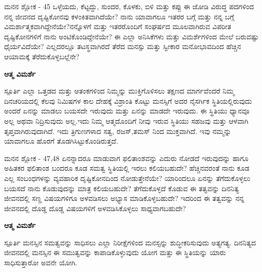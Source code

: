 \newpage
\begin{mananam}{\kanfont ಮನನ ಶ್ಲೋಕ - \textenglish{45}}
\footnotesize \mananamfont ಒಳ್ಳೆಯದು, ಕೆಟ್ಟದ್ದು, ಸುಂದರ, ಕೊಳಕು, ಬಿಳಿ ಮತ್ತು ಕಪ್ಪು ಈ ಜೋಡಿ ವಿರುದ್ಧ ಪದಗಳಿಂದ ನನ್ನ ಜೀವನದ ದೃಷ್ಟಿಕೋನವು ಕಳಂಕಿತವಾಗಿದೆಯೇ? ನಾನು ಯಾವಾಗಲೂ ಇತರರ ಬಗ್ಗೆ ಮತ್ತು ನನ್ನ ಬಗ್ಗೆ ವಿಮರ್ಶಾತ್ಮಕವಾಗಿದ್ದೇನೆಯೇ?ನನ್ನೊಳಗೆ ಮತ್ತು ಇತರರೊಂದಿಗೆ ಸಂಘರ್ಷದ ಮೂಲವಾಗಿರುವ ವಿಪರೀತ ದೃಷ್ಟಿಕೋನಗಳಿಗೆ ನಾನು ಅಂಟಿಕೊಂಡಿದ್ದೇನೆಯೇ? ಈ ಎಲ್ಲಾ ಅನಿಸಿಕೆಗಳು ಮತ್ತು ವಿಮರ್ಶೆಗಳಿಂದ ಮೇಲೆ ಬರುವಷ್ಟು ಧೈರ್ಯವಿದೆಯೇ? ಎಲ್ಲದರಲ್ಲೂ ತಟಸ್ಥವಾಗಿರದೆ ತೆರೆದ ಮನಸ್ಸು ಮತ್ತು ಸ್ವೀಕಾರ ಮನೋಭಾವದಿಂದ ಹೆಚ್ಚಿನ ಆಯಾಮಕ್ಕೆ ತೆರೆದುಕೊಳ್ಳಬಲ್ಲೆನೇ?
\end{mananam}
\WritingHand\enspace\textbf{ಆತ್ಮ ವಿಮರ್ಶೆ}
\begin{inspiration}{\kanfont ಸ್ಪೂರ್ತಿ}
\footnotesize \mananamfont ಎಲ್ಲಾ ಒತ್ತಡದ ಮತ್ತು ಆತಂಕಗಳಿಂದ ನಿಮ್ಮನ್ನು ಮುಕ್ತಿಗೊಳಿಸಲು ತಕ್ಷಣದ ಮಾರ್ಗವೆಂದರೆ ನಿಮ್ಮ ದಿನಚರಿಯದಲ್ಲಿ ಕೆಲವು ನಿಮಿಷಗಳ ಕಾಲ ದೇಹಕ್ಕೆ ವಿಶ್ರಾಂತಿ ಕೊಟ್ಟು ಮನಸ್ಸಿಗೆ ಅದರ ನೈಸರ್ಗಿಕ ಸ್ಥಿತಿಯಲ್ಲಿರುವುದು ಅಂದರೆ ಏನನ್ನು ಮಾಡಲು ಬಯಸದೇ ಇರುವುದು ಮತ್ತು ಏನನ್ನು ಮಾಡದೇ ಇರುವುದು. ಈ ಸ್ಥಿತಿಯು ಧ್ಯಾನವೂ ಅಲ್ಲ ಅಥವಾ ನಿದ್ರಿಸುವುದು ಅಲ್ಲ.ಇದು ನಿಮ್ಮ ಆತ್ಮದೊಂದಿಗೆ ನೀವು ಇರುವ ಸ್ಥಿತಿಯು ಸಹಜವು ಮತ್ತು ಆಳವಾಗಿ ತೃಪ್ತವಾಗಿರುವುದಾಗಿದೆ. ಇದು ತ್ರಿಗುಣಗಳಾದ ಸತ್ವ, ರಜಸ್,ತಮಸ್ ನಿಂದ ಮುಕ್ತವಾಗಿದೆ. ಇವು ನಮ್ಮನ್ನು ಯಾವಾಗಲೂ ಹೊರಗೆ ತೊಡಗಿಸಿಟ್ಟುಕೊಂಡಿರುತ್ತದೆ.
\end{inspiration}
\newpage



\newpage
\begin{mananam}{\kanfont ಮನನ ಶ್ಲೋಕ - \textenglish{47,48}}
\footnotesize \mananamfont ಏನನ್ನಾದರೂ ಮಾಡುವಾಗ ಫಲಿತಾಂಶವನ್ನು ಎದುರು ನೋಡದೆ ಇರುವುದನ್ನು ಹಾಗೂ ಅಹಿತಕರ ಫಲಿತಾಂಶ ಬಂದರೂ ಕೂಡ ಸಮತ್ವ ಸ್ಥಿತಿಯಲ್ಲಿ ಇರಲು ಕಲಿಯಬಹುದೇ? ಹೆಚ್ಚಿನವರಂತೆ ನಾನು ಕೂಡ ಎಲ್ಲ ಸಂಬಂಧಗಳನ್ನು ವ್ಯವಹಾರಿಕ ದೃಷ್ಟಿಕೋನದಿಂದ ನೋಡುತ್ತೇನೆಯೇ? ಯಾರಿಂದಲೂ ಏನನ್ನು ತೆಗೆದುಕೊಳ್ಳಲು ಬಯಸದೆ ನಾನು ಕೊಡುವುದನ್ನು ಮಾತ್ರ ಕಲಿಯಬಹುದೇ? ತೆಗೆದುಕೊಳ್ಳದೆ ಕೊಡುವ ಈ ತತ್ವವನ್ನು ದಿನನಿತ್ಯ ಜೀವನದಲ್ಲಿ ಸಣ್ಣ ವಿಷಯಗಳಿಗೂ ಅಳವಡಿಸಲು ಅಭ್ಯಾಸ ಮಾಡಿಕೊಳ್ಳಬಹುದೇ? ಇದರಿಂದ ಈ ತತ್ವವನ್ನು ನನ್ನ ಜೀವನದಲ್ಲಿ ದೊಡ್ಡ ದೊಡ್ಡ ವಿಷಯಗಳಿಗೆ ಅಳವಡಿಸಿಕೊಳ್ಳಲು ಸಾಧ್ಯವಾಗಬಹುದೇ?
\end{mananam}
\WritingHand\enspace\textbf{ಆತ್ಮ ವಿಮರ್ಶೆ}
\begin{inspiration}{\kanfont ಸ್ಪೂರ್ತಿ}
\footnotesize \mananamfont ಮನಸ್ಸಿನ ಸಮತ್ವವನ್ನು ಸಾಧಿಸಲು ಎಲ್ಲಾ ನಿರೀಕ್ಷೆಗಳಿಂದ ಮನಸ್ಸನ್ನು ಶುದ್ಧೀಕರಿಸುವುದು ಅತ್ಯಗತ್ಯ. ದಿನನಿತ್ಯದ ಜೀವನದಲ್ಲಿ ಮನಸ್ಸಿನ ಈ ಸಮುತ್ವವನ್ನು ಕಾಪಾಡಿಕೊಳ್ಳುವುದು ಯೋಗ ಮತ್ತು ಈ ಸ್ಥಿತಿಯನ್ನು ಯಾರು ಸಾಧಿಸುತ್ತಾರೋ ಅವನೇ ಯೋಗಿ.
\end{inspiration}
\newpage


